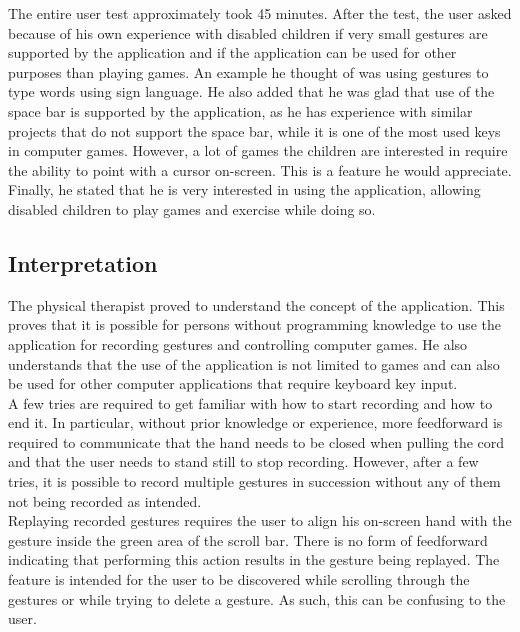 The entire user test approximately took 45 minutes. After the test, the user asked because of his own experience with disabled children if very small gestures are supported by the application and if the application can be used for other purposes than playing games. An example he thought of was using gestures to type words using sign language. He also added that he was glad that use of the space bar is supported by the application, as he has experience with similar projects that do not support the space bar, while it is one of the most used keys in computer games. However, a lot of games the children are interested in require the ability to point with a cursor on-screen. This is a feature he would appreciate. Finally, he stated that he is very interested in using the application, allowing disabled children to play games and exercise while doing so.


\subsection{Interpretation}

The physical therapist proved to understand the concept of the application. This proves that it is possible for persons without programming knowledge to use the application for recording gestures and controlling computer games. He also understands that the use of the application is not limited to games and can also be used for other computer applications that require keyboard key input.\\

A few tries are required to get familiar with how to start recording and how to end it. In particular, without prior knowledge or experience, more feedforward is required to communicate that the hand needs to be closed when pulling the cord and that the user needs to stand still to stop recording. However, after a few tries, it is possible to record multiple gestures in succession without any of them not being recorded as intended.\\

Replaying recorded gestures requires the user to align his on-screen hand with the gesture inside the green area of the scroll bar. There is no form of feedforward indicating that performing this action results in the gesture being replayed. The feature is intended for the user to be discovered while scrolling through the gestures or while trying to delete a gesture. As such, this can be confusing to the user.\\

